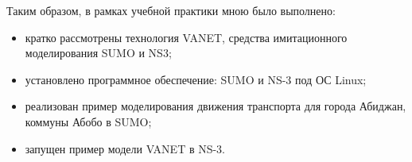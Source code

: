 Таким образом, в рамках учебной практики мною было выполнено:
\begin{itemize}
\item кратко рассмотрены технология VANET, средства имитационного моделирования SUMO и NS3;
\item установлено программное обеспечение: SUMO и NS-3 под ОС Linux;
\item реализован пример моделирования движения транспорта для города Абиджан, коммуны Абобо в SUMO;
\item запущен пример модели VANET в NS-3.
\end{itemize}